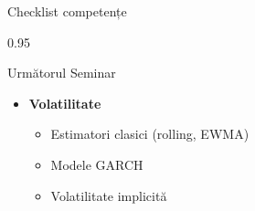 \documentclass[9pt, aspectratio=169, t]{beamer}
\begin{document}
\begin{frame}[shrink=15]{Checklist competențe}
\begin{cminipage}{0.95\textwidth}
\vspace{0.3cm}
\begin{block}{Următorul Seminar}
\begin{itemize}\setlength{\itemsep}{0pt}
    \item \textbf{Volatilitate}
    \begin{itemize}\setlength{\itemsep}{0pt}
        \item Estimatori clasici (rolling, EWMA)
        \item Modele GARCH
        \item Volatilitate implicită
    \end{itemize}
\end{itemize}
\end{block}
\end{cminipage}
\end{frame}
\end{document}
